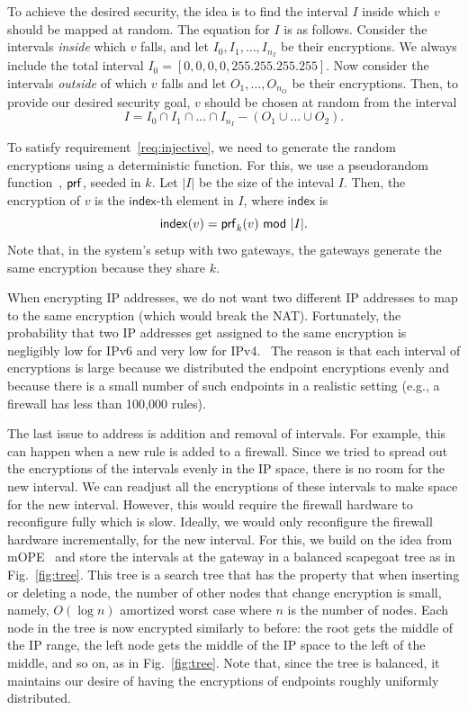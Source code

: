 To achieve the desired security, the idea is to find the interval $I$ inside which $v$ should be mapped at random. The equation for $I$ is as follows. Consider the intervals {\em inside} which $v$ falls, and let $I_0, I_1, \dots, I_{n_I}$ be their encryptions. We always include the total interval $I_0 = [0,0,0,0, 255.255.255.255]$. Now consider the intervals {\em outside} of which $v$ falls and let $O_1, \dots, O_{n_O}$ be their encryptions. Then, to provide our desired security goal, $v$ should be chosen at random from the interval  
\begin{equation}
 I = I_0 \cap I_1 \cap ... \cap I_{n_I} - (O_1 \cup \dots \cup O_2). \label{eq:randominterval}
 \end{equation}

 


To satisfy requirement~\ref{req:injective}, we need to generate the random encryptions using a deterministic function. For this, we use a pseudorandom function~\cite{GoldreichVol1}, $\mathsf{prf}$, seeded in $k$.   Let $|I|$ be the size of the inteval $I$. 
Then, the encryption of $v$ is the $\mathsf{index}$-th element in $I$, where $\mathsf{index}$ is 
\[ \mathsf{index}(v) = \prf_k(v)\ \mod\ |I|. \] 
  Note that, in the system's setup with two gateways, the gateways generate the same encryption because they share $k$. 

When encrypting IP addresses, we do not want two different IP addresses to map to the same encryption (which would break the NAT). Fortunately, the probability that  two IP addresses get assigned to the same encryption is negligibly low for IPv6 and very low for IPv4.~ The reason is that  each interval of encryptions is large because we distributed the endpoint encryptions evenly and because there is a small number of such endpoints in a realistic setting (e.g., a firewall has less than 100,000 rules).



The last issue to address is addition and removal of intervals. For example, this can happen when a new rule is added to a firewall. 
Since we tried to spread out the encryptions of the intervals evenly in the IP space, there is no room for the new interval. We can 
readjust all the encryptions of these intervals to make space for the new interval. However, this would require the firewall hardware to reconfigure fully which is slow. Ideally, we would only reconfigure the firewall hardware incrementally, for the new interval. For this, we build on the idea from mOPE~\cite{popa:mope} and store the intervals at the gateway in a balanced scapegoat tree as in Fig.~\ref{fig:tree}. This tree is a search tree that has the property that when inserting or deleting a node, the number of other nodes that change encryption is small, namely, $O(\log n)$ amortized worst case where $n$ is the number of nodes. Each node in the tree is now encrypted similarly to before: the root gets the middle of the IP range,  the left node gets the middle of the IP space to the left of the middle, and so on, as in Fig.~\ref{fig:tree}.  Note that, since the tree is balanced, it maintains our desire of having the encryptions of endpoints roughly uniformly distributed.

